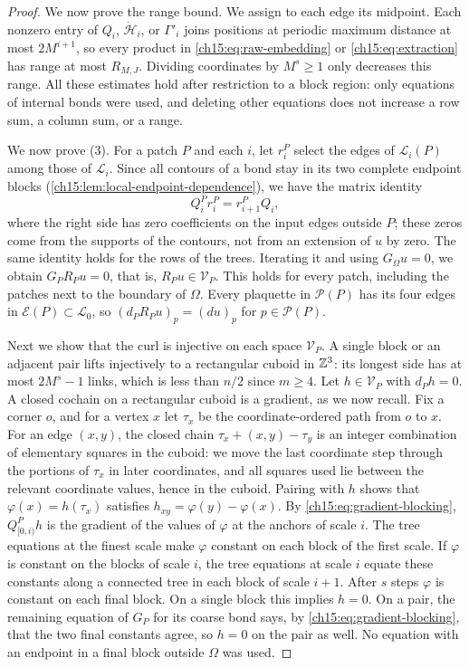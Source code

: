 \begin{proof}
We now prove the range bound. We assign to each edge its midpoint. Each nonzero entry of $Q_i$, $\dot{\mathcal H}_i$, or $\Gamma'_i$ joins positions at periodic maximum distance at most $2M^{i+1}$, so every product in \eqref{ch15:eq:raw-embedding} or \eqref{ch15:eq:extraction} has range at most $R_{M,J}$. Dividing coordinates by $M^s\ge1$ only decreases this range. All these estimates hold after restriction to a block region: only equations of internal bonds were used, and deleting other equations does not increase a row sum, a column sum, or a range.

We now prove (3). For a patch $P$ and each $i$, let $r^P_i$ select the edges of $\mathcal L_i(P)$ among those of $\mathcal L_i$. Since all contours of a bond stay in its two complete endpoint blocks (\cref{ch15:lem:local-endpoint-dependence}), we have the matrix identity
\[
 Q^P_ir^P_i=r^P_{i+1}Q_i ,
\]
where the right side has zero coefficients on the input edges outside $P$; these zeros come from the supports of the contours, not from an extension of $u$ by zero. The same identity holds for the rows of the trees. Iterating it and using $G_\Omega u=0$, we obtain $G_PR_Pu=0$, that is, $R_Pu\in\mathcal V_P$. This holds for every patch, including the patches next to the boundary of $\Omega$. Every plaquette in $\mathcal P(P)$ has its four edges in $\mathcal E(P)\subset\mathcal L_0$, so $(d_PR_Pu)_p=(du)_p$ for $p\in\mathcal P(P)$.

Next we show that the curl is injective on each space $\mathcal V_P$. A single block or an adjacent pair lifts injectively to a rectangular cuboid in $\mathbb Z^3$: its longest side has at most $2M^s-1$ links, which is less than $n/2$ since $m\ge4$. Let $h\in\mathcal V_P$ with $d_Ph=0$. A closed cochain on a rectangular cuboid is a gradient, as we now recall. Fix a corner $o$, and for a vertex $x$ let $\tau_x$ be the coordinate-ordered path from $o$ to $x$. For an edge $(x,y)$, the closed chain $\tau_x+(x,y)-\tau_y$ is an integer combination of elementary squares in the cuboid: we move the last coordinate step through the portions of $\tau_x$ in later coordinates, and all squares used lie between the relevant coordinate values, hence in the cuboid. Pairing with $h$ shows that $\varphi(x)=h(\tau_x)$ satisfies $h_{xy}=\varphi(y)-\varphi(x)$. By \eqref{ch15:eq:gradient-blocking}, $Q^P_{[0,i)}h$ is the gradient of the values of $\varphi$ at the anchors of scale $i$. The tree equations at the finest scale make $\varphi$ constant on each block of the first scale. If $\varphi$ is constant on the blocks of scale $i$, the tree equations at scale $i$ equate these constants along a connected tree in each block of scale $i+1$. After $s$ steps $\varphi$ is constant on each final block. On a single block this implies $h=0$. On a pair, the remaining equation of $G_P$ for its coarse bond says, by \eqref{ch15:eq:gradient-blocking}, that the two final constants agree, so $h=0$ on the pair as well. No equation with an endpoint in a final block outside $\Omega$ was used.


\end{proof}
